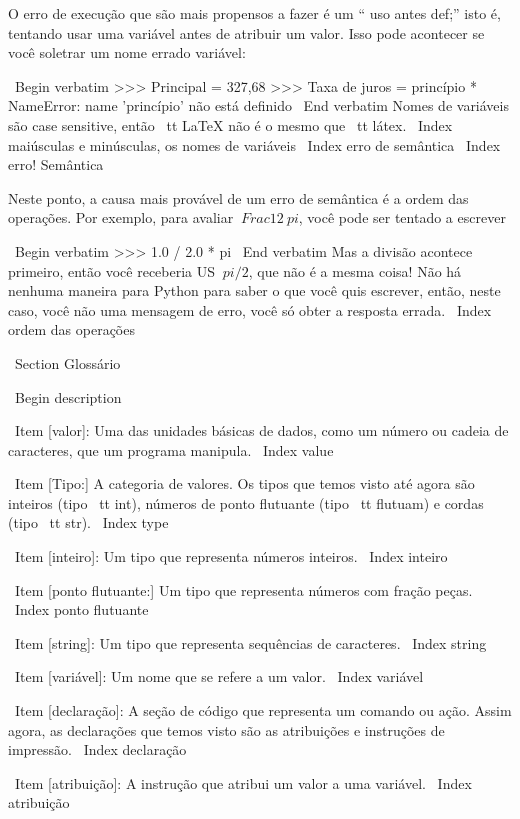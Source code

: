 \documentclass[10pt]{book}
\begin{document}
{O erro de execução que são mais propensos a fazer é um `` uso antes
def;'' isto é, tentando usar uma variável antes de atribuir
um valor. Isso pode acontecer se você soletrar um nome errado variável:

\ Begin {verbatim}
>>> Principal = 327,68
>>> Taxa de juros = princípio *
NameError: name 'princípio' não está definido
\ End {verbatim}
%
Nomes de variáveis ​​são case sensitive, então {\ tt LaTeX} não é o
mesmo que {\ tt látex}.
\ Index {maiúsculas e minúsculas, os nomes de variáveis}
\ Index {erro de semântica}
\ Index {erro! Semântica}

Neste ponto, a causa mais provável de um erro de semântica é
a ordem das operações. Por exemplo, para avaliar
 $ \ Frac {1} {2 \ pi} $,
você pode ser tentado a escrever

\ Begin {verbatim}
>>> 1.0 / 2.0 * pi
\ End {verbatim}
%
Mas a divisão acontece primeiro, então você receberia US $ \ pi / 2 $, que
não é a mesma coisa! Não há nenhuma maneira para Python
para saber o que você quis escrever, então, neste caso, você não
uma mensagem de erro, você só obter a resposta errada.
\ Index {ordem das operações}


\ Section {} Glossário

\ Begin {description}

\ Item [valor]: Uma das unidades básicas de dados, como um número ou cadeia de caracteres, 
que um programa manipula.
\ Index {value}

\ Item [Tipo:] A categoria de valores. Os tipos que temos visto até agora
são inteiros (tipo {\ tt int}), números de ponto flutuante (tipo {\ tt
flutuam}) e cordas (tipo {\ tt str}).
\ Index {type}

\ Item [inteiro]: Um tipo que representa números inteiros.
\ Index {inteiro}

\ Item [ponto flutuante:] Um tipo que representa números com fração
peças.
\ Index {ponto flutuante}

\ Item [string]: Um tipo que representa sequências de caracteres.
\ Index {string}

\ Item [variável]: Um nome que se refere a um valor.
\ Index {variável}

\ Item [declaração]: A seção de código que representa um comando ou ação. Assim
agora, as declarações que temos visto são as atribuições e instruções de impressão.
\ Index {declaração}

\ Item [atribuição]: A instrução que atribui um valor a uma variável.
\ Index {atribuição}

}
\end{document}
